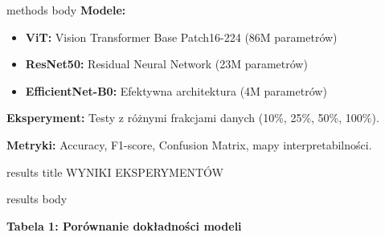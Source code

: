 \documentclass[final]{beamer}
\begin{document}
\begin{frame}[t]
\begin{columns}[T]
\begin{column}{.48\linewidth}
{\begin{beamercolorbox}[wd=\linewidth,dp=0.3cm]{methods body}
                \textbf{Modele:}
                \begin{itemize}
                    \item \textbf{ViT:} Vision Transformer Base Patch16-224 (86M parametrów)
                    \item \textbf{ResNet50:} Residual Neural Network (23M parametrów)
                    \item \textbf{EfficientNet-B0:} Efektywna architektura (4M parametrów)
                \end{itemize}
                
                \vspace{0.15cm}
                \textbf{Eksperyment:} Testy z różnymi frakcjami danych (10\%, 25\%, 50\%, 100\%).
                
                \vspace{0.15cm}
                \textbf{Metryki:} Accuracy, F1-score, Confusion Matrix, mapy interpretabilności.
                \vspace{0.15cm}
            \end{beamercolorbox}}
            \vspace{0.15cm}
            
            {%
            \begin{beamercolorbox}[wd=\linewidth,center]{results title}
                \large WYNIKI EKSPERYMENTÓW
                \vspace{0.2cm}
            \end{beamercolorbox}}
            {%
            \begin{beamercolorbox}[wd=\linewidth,dp=0.3cm]{results body}
                \vspace{0.15cm}
                
                \textbf{Tabela 1: Porównanie dokładności modeli}
                \vspace{0.3cm}
                
                \begin{center}
\end{center}
                

\end{beamercolorbox}}
\end{column}
\end{columns}
\end{frame}
\end{document}
